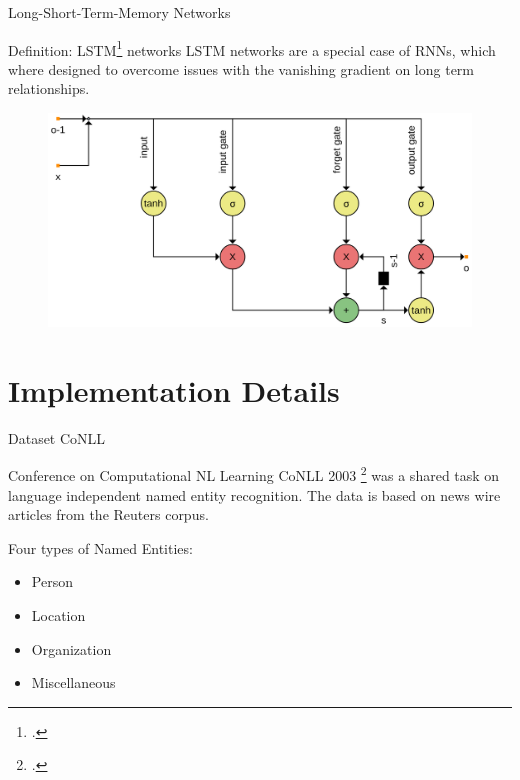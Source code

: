 \documentclass[12pt, tikz]{beamer}
\begin{document}
\begin{frame}[fragile]{Long-Short-Term-Memory Networks}

	\begin{block}{Definition: LSTM\footcite{hochreiter1997long} networks}
		LSTM networks are a special case of RNNs, which where designed to overcome issues with the vanishing gradient on long term relationships.
	\end{block}
	\pause
	\vspace{-0.5cm}
	\begin{center}
		\begin{figure}
			\includegraphics[width=0.9\linewidth]{img/lstm.png}
		\end{figure}
	\end{center}
\end{frame}

\section{Implementation Details}

\begin{frame}[fragile]{Dataset CoNLL}
	
	\begin{block}{Conference on Computational NL Learning}
		CoNLL 2003 \footcite{tjongkimsang2003conll} was a shared task on language independent named entity recognition. The data is based on news wire articles from the Reuters corpus.
	\end{block}
	\pause
	Four types of Named Entities:
	\begin{itemize}
		\item Person
		\item Location
		\item Organization
		\item Miscellaneous
	\end{itemize}

\end{frame}
\end{document}
